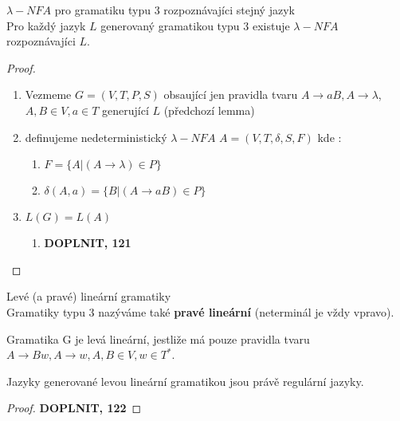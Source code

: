 \documentclass[../main.tex]{subfiles}
\begin{document}
\begin{theorem}
    $\lambda-NFA$ pro gramatiku typu 3 rozpoznávajíci stejný jazyk\\

    Pro každý jazyk $L$ generovaný gramatikou typu 3 existuje $\lambda-NFA$ rozpoznávajíci $L$.
    
    \begin{proof}
        \begin{enumerate}
            \item Vezmeme $G = (V,T,P,S)$ obsaující jen pravidla tvaru $A\rightarrow aB, A \rightarrow \lambda$,
            $A,B \in V, a\in T$ generující $L$ (předchozí lemma)
            \item definujeme nedeterministický $\lambda-NFA$ $A = (V,T,\delta, S, F)$ kde :
            \begin{enumerate}
                \item $F = \{A | (A\rightarrow \lambda) \in P\}$
                \item $\delta(A,a) = \{B | (A \rightarrow aB) \in P\}$
            \end{enumerate}
            \item $L(G) = L(A)$
            \begin{enumerate}
                \item \textbf{DOPLNIT, 121}
            \end{enumerate}
        \end{enumerate}
    \end{proof}
\end{theorem}

\begin{definition}
    Levé (a pravé) lineární gramatiky\\

    Gramatiky typu 3 nazýváme také \textbf{pravé lineární} (neterminál je vždy vpravo).

    Gramatika G je levá lineární, jestliže má pouze pravidla tvaru $A \rightarrow Bw, A \rightarrow w, A,B\in V, w\in T^*$.
\end{definition}

\begin{theorem}
    Jazyky generované levou lineární gramatikou jsou právě regulární jazyky.

    \begin{proof}
        \textbf{DOPLNIT, 122}
    \end{proof}
\end{theorem}
\end{document}
